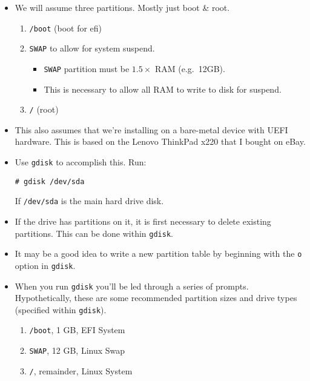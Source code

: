 \documentclass{article}
\begin{document}
\begin{itemize}
  \item We will assume three partitions.
    Mostly just boot \& root.
  \begin{enumerate}
    \item \verb|/boot| (boot for efi)
    \item \verb|SWAP| to allow for system suspend.
    \begin{itemize}
      \item \verb|SWAP| partition must be $1.5\times$ RAM (e.g.~12GB).
      \item This is necessary to allow all RAM to write to disk for suspend.
    \end{itemize}
    \item \verb|/| (root)
  \end{enumerate}
  \item This also assumes that we're installing on a bare-metal device with UEFI hardware.
    This is based on the Lenovo ThinkPad x220 that I bought on eBay.
  \item Use \verb|gdisk| to accomplish this. Run: 
\begin{verbatim}
# gdisk /dev/sda
\end{verbatim}
    If \verb|/dev/sda| is the main hard drive disk.
  \item If the drive has partitions on it, it is first necessary to delete existing partitions.
    This can be done within \verb|gdisk|.
  \item It may be a good idea to write a new partition table by beginning with the \verb|o| option in \verb|gdisk|.
  \item When you run \verb|gdisk| you'll be led through a series of prompts.
    Hypothetically, these are some recommended partition sizes and drive types (specified within \verb|gdisk|).
  \begin{enumerate}
    \item \verb|/boot|, 1 GB, EFI System
    \item \verb|SWAP|, 12 GB, Linux Swap
    \item \verb|/|, remainder, Linux System
  \end{enumerate}
\end{itemize}
\end{document}
